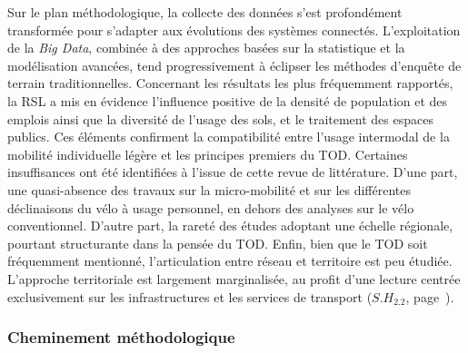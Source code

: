 \begin{refsegment}
Sur le plan méthodologique, la collecte des données s’est profondément transformée pour s’adapter aux évolutions des systèmes connectés. L’exploitation de la \textsl{Big Data}, combinée à des approches basées sur la statistique et la modélisation avancées, tend progressivement à éclipser les méthodes d’enquête de terrain traditionnelles. Concernant les résultats les plus fréquemment rapportés, la \acrshort{RSL} a mis en évidence l’influence positive de la densité de population et des emplois ainsi que la diversité de l'usage des sols, et le traitement des espaces publics. Ces éléments confirment la compatibilité entre l'usage intermodal de la mobilité individuelle légère et les principes premiers du \acrshort{TOD}. Certaines insuffisances ont été identifiées à l’issue de cette revue de littérature. D'une part, une quasi-absence des travaux sur la micro-mobilité et sur les différentes déclinaisons du vélo à usage personnel, en dehors des analyses sur le vélo conventionnel. D'autre part, la rareté des études adoptant une échelle régionale, pourtant structurante dans la pensée du \acrshort{TOD}. Enfin, bien que le \acrshort{TOD} soit fréquemment mentionné, l'articulation entre réseau et territoire est peu étudiée. L’approche territoriale est largement marginalisée, au profit d’une lecture centrée exclusivement sur les infrastructures et les services de transport (\hyperref[sous-hypothese-2.2]{\(S.H_{2.2}\)}, page~\pageref{sous-hypothese-2.2}).%

\subsubsection*{Cheminement méthodologique
    \label{conclusion-generale:principaux-apports-chapitre3}
    }


\end{refsegment}
